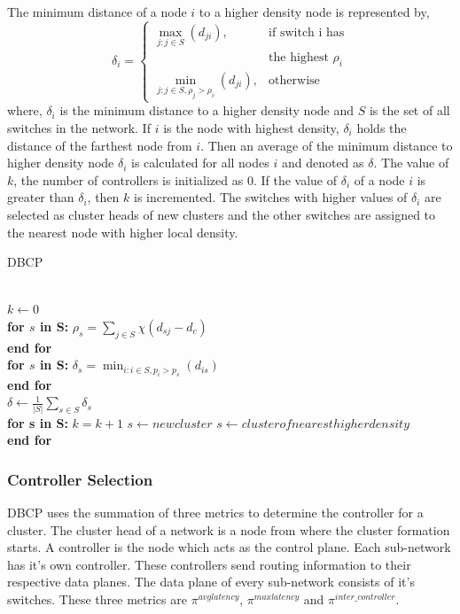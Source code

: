 \documentclass[a4paper,twocolumn,preprint]{elsarticle}
\begin{document}
The minimum distance of a node $i$ to a higher density node is represented by,
\begin{equation} \label{dbcp:mindistohi}
\delta_i=\begin{cases}
\max_{j:j\in S}(d_{ji}), & \text{if switch i has}\\ & \text{the highest $\rho_i$}\\
\min_{j:j\in S,\rho_j>\rho_i}(d_{ji}), & \text{otherwise}
\end{cases}
\end{equation}
where, $\delta_i$ is the minimum distance to a higher density node and $S$ is the set of all switches in the network. If $i$ is the node with highest density, $\delta_i$ holds the distance of the farthest node from $i$. Then an average of the minimum distance to higher density node $\delta_i$ is calculated for all nodes $i$ and denoted as $\delta$. The value of $k$, the number of controllers is initialized as $0$. If the value of $\delta_i$ of a node $i$ is greater than $\delta_i$, then $k$ is incremented. The switches with higher values of $\delta_i$ are selected as cluster heads of new clusters and the other switches are assigned to the nearest node with higher local density.


\begin{algorithm}
	\caption{DBCP}\label{algo:dbcp}
	\begin{algorithmic}[1]
		 \\
		$k \gets 0$ \\
		\textbf{for $s$ in S:}
		\State $\rho_s=\sum_{j\in S}\chi(d_{sj}-d_c)$ \\
		\textbf{end for} \\
		\textbf{for $s$ in S:}
		\State $\delta_s=\min_{i:i\in S,p_i>p_s}(d_{is})$ \\
		\textbf{end for} \\
		$\delta \gets \frac{1}{|S|}\sum_{s\in S}\delta_s$ \\
		\textbf{for s in S:}
		\State $k = k + 1$
		\State $s \gets newcluster$
		\Else
		\State $s \gets cluster of nearest higher density$
		\EndIf \\
		\textbf{end for}
		\EndProcedure
	\end{algorithmic}
\end{algorithm}

\subsubsection{Controller Selection} \label{dbcp:consel}
DBCP uses the summation of three metrics to determine the controller for a cluster. The cluster head of a network is a node from where the cluster formation starts. A controller is the node which acts as the control plane. Each sub-network has it's own controller. These controllers send routing information to their respective data planes. The data plane of every sub-network consists of it's switches. These three metrics are $\pi^{avglatency}$, $\pi^{maxlatency}$ and $\pi^{inter\_controller}$.
\end{document}
